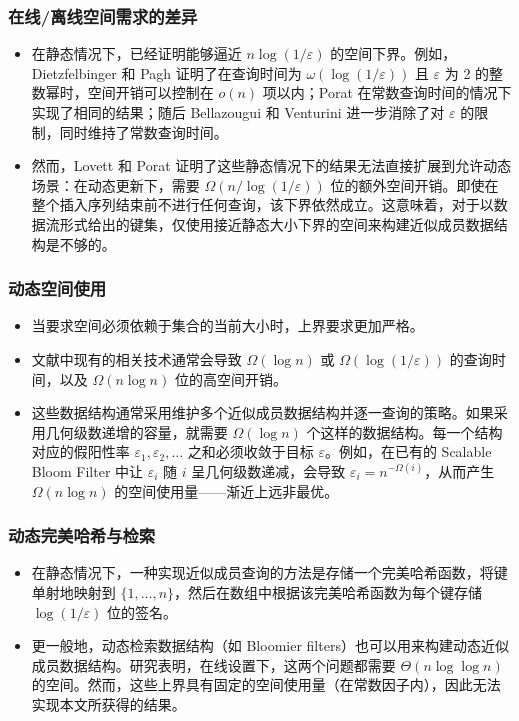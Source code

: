 \documentclass[UTF8,11pt,a4paper]{ctexart}
\begin{document}
\subsubsection{在线/离线空间需求的差异}
\begin{itemize}
    \item 在静态情况下，已经证明能够逼近 $n\log(1/\varepsilon)$ 的空间下界。例如，Dietzfelbinger 和 Pagh 证明了在查询时间为 $\omega(\log(1/\varepsilon))$ 且 $\varepsilon$ 为 2 的整数幂时，空间开销可以控制在 $o(n)$ 项以内；Porat 在常数查询时间的情况下实现了相同的结果；随后 Bellazougui 和 Venturini 进一步消除了对 $\varepsilon$ 的限制，同时维持了常数查询时间。
    \item 然而，Lovett 和 Porat 证明了这些静态情况下的结果无法直接扩展到允许动态场景：在动态更新下，需要 $\Omega(n/\log(1/\varepsilon))$ 位的额外空间开销。即使在整个插入序列结束前不进行任何查询，该下界依然成立。这意味着，对于以数据流形式给出的键集，仅使用接近静态大小下界的空间来构建近似成员数据结构是不够的。
\end{itemize}

\subsubsection{动态空间使用}
\begin{itemize}
    \item 当要求空间必须依赖于集合的当前大小时，上界要求更加严格。
    \item 文献中现有的相关技术通常会导致 $\Omega(\log n)$ 或 $\Omega(\log(1/\varepsilon))$ 的查询时间，以及 $\Omega(n\log n)$ 位的高空间开销。
    \item 这些数据结构通常采用维护多个近似成员数据结构并逐一查询的策略。如果采用几何级数递增的容量，就需要 $\Omega(\log n)$ 个这样的数据结构。每一个结构对应的假阳性率 $\varepsilon_1, \varepsilon_2, \dots$ 之和必须收敛于目标 $\varepsilon$。例如，在已有的 Scalable Bloom Filter 中让 $\varepsilon_i$ 随 $i$ 呈几何级数递减，会导致 $\varepsilon_i = n^{-\Omega(i)}$，从而产生 $\Omega(n\log n)$ 的空间使用量——渐近上远非最优。
\end{itemize}

\subsubsection{动态完美哈希与检索}
\begin{itemize}
    \item 在静态情况下，一种实现近似成员查询的方法是存储一个完美哈希函数，将键单射地映射到 $\{1,\dots,n\}$，然后在数组中根据该完美哈希函数为每个键存储 $\log(1/\varepsilon)$ 位的签名。
    \item 更一般地，动态检索数据结构（如 Bloomier filters）也可以用来构建动态近似成员数据结构。研究表明，在线设置下，这两个问题都需要 $\Theta(n\log\log n)$ 的空间。然而，这些上界具有固定的空间使用量（在常数因子内），因此无法实现本文所获得的结果。
\end{itemize}
\end{document}
